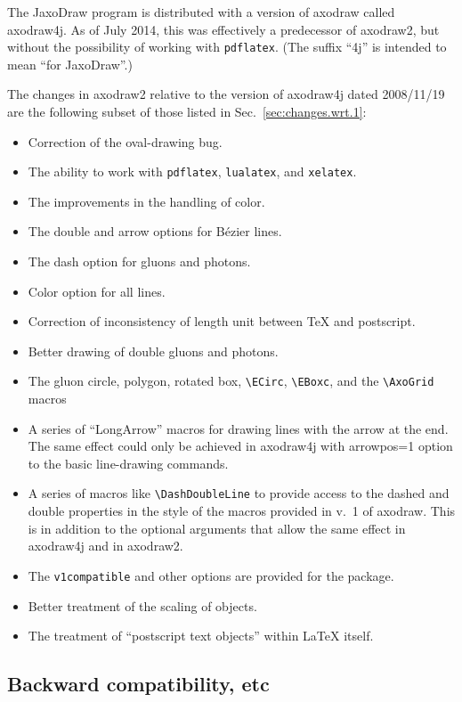 \documentclass[12pt]{article}
\def\program#1{\texttt{#1}}
\begin{document}
The JaxoDraw program \cite{jaxodraw2} is distributed with a
version of axodraw called axodraw4j.  As of July 2014, this was
effectively a predecessor of axodraw2, but without the possibility of
working with \program{pdflatex}.  (The suffix ``4j'' is intended to mean ``for
JaxoDraw''.)

The changes in axodraw2 relative to the version of axodraw4j dated
2008/11/19 are the following subset of those listed in Sec.\
\ref{sec:changes.wrt.1}:
\begin{itemize}
\item Correction of the oval-drawing bug.
\item The ability to work with \program{pdflatex}, \program{lualatex},
  and  \program{xelatex}.
\item The improvements in the handling of color.
\item The double and arrow options for B\'ezier lines.
\item The dash option for gluons and photons.
\item Color option for all lines.
\item Correction of inconsistency of length unit between \TeX{} and
  postscript. 
\item Better drawing of double gluons and photons.
\item The gluon circle, polygon, rotated box, \verb+\ECirc+,
  \verb+\EBoxc+, and the \verb+\AxoGrid+ macros
\item A series of ``LongArrow'' macros for drawing lines with the
  arrow at the end.  The same effect could only be achieved in
  axodraw4j with arrowpos=1 option to the basic line-drawing
  commands.
\item A series of macros like \verb+\DashDoubleLine+ to provide access
  to the dashed and double properties in the style of the macros
  provided in v.\ 1 of axodraw.  This is in addition to the optional
  arguments that allow the same effect in axodraw4j and in axodraw2.
\item The \texttt{v1compatible} and other options are provided for the
  package.
\item Better treatment of the scaling of objects.
\item The treatment of ``postscript text objects'' within \LaTeX{}
  itself. 
\end{itemize}


\subsection{Backward compatibility, etc}
\end{document}
